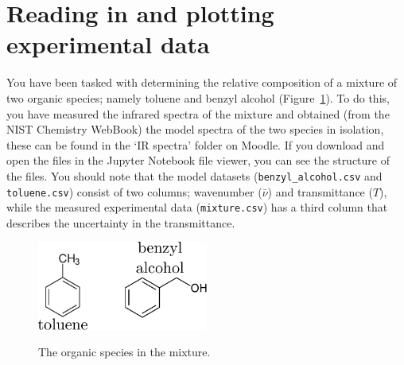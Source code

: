\documentclass[a4paper]{article}
\begin{document}
\section{Reading in and plotting experimental data}
You have been tasked with determining the relative composition of a mixture of two organic species; namely toluene and benzyl alcohol (Figure~\ref{fig:mole}). 
To do this, you have measured the infrared spectra of the mixture and obtained (from the NIST Chemistry WebBook) the model spectra of the two species in isolation, these can be found in the `IR spectra' folder on Moodle. 
If you download and open the files in the Jupyter Notebook file viewer, you can see the structure of the files. 
You should note that the model datasets (\texttt{benzyl\_alcohol.csv} and \texttt{toluene.csv}) consist of two columns; wavenumber ($\bar{\nu}$) and transmittance ($T$), while the measured experimental data (\texttt{mixture.csv}) has a third column that describes the uncertainty in the transmittance. 
%
\begin{figure}[t]
  \centering
  \includegraphics[width=0.5\textwidth]{drawing}
  \label{fig:mole}
  \caption{The organic species in the mixture.}
  \end{figure}
%
\vspace{\baselineskip}
\begin{center}
	\noindent{}
\end{center}
\end{document}
